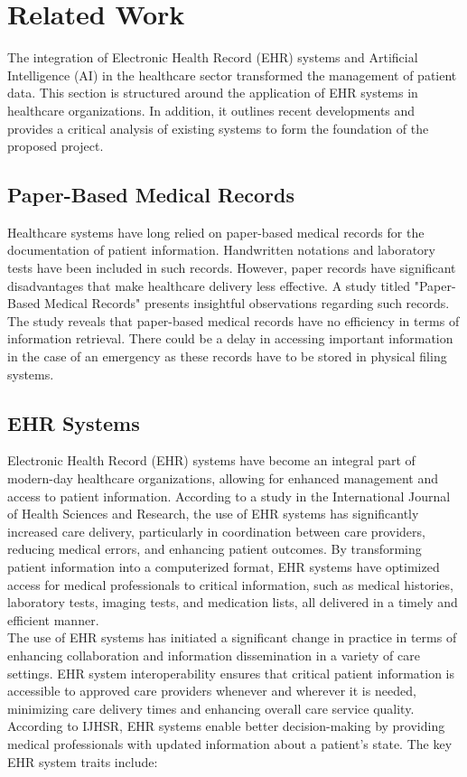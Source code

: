 \section{Related Work}
The integration of Electronic Health Record (EHR) systems and Artificial Intelligence (AI) in the healthcare sector transformed the management of patient data. This section is structured around the application of EHR systems in healthcare organizations. In addition, it outlines recent developments and provides a critical analysis of existing systems to form the foundation of the proposed project.
\subsection{Paper-Based Medical Records}
Healthcare systems have long relied on paper-based medical records for the documentation of patient information. Handwritten notations and laboratory tests have been included in such records. However, paper records have significant disadvantages that make healthcare delivery less effective. A study titled "Paper-Based Medical Records"  presents insightful observations regarding such records.\cite{article6}
The study reveals that paper-based medical records have no efficiency in terms of information retrieval. There could be a delay in accessing important information in the case of an emergency as these records have to be stored in physical filing systems.
\subsection{EHR Systems}
Electronic Health Record (EHR) systems have become an integral part of modern-day healthcare organizations, allowing for enhanced management and access to patient information. According to a study in the International Journal of Health Sciences and Research, the use of EHR systems has significantly increased care delivery, particularly in coordination between care providers, reducing medical errors, and enhancing patient outcomes. By transforming patient information into a computerized format, EHR systems have optimized access for medical professionals to critical information, such as medical histories, laboratory tests, imaging tests, and medication lists, all delivered in a timely and efficient manner.\cite{Odekunle2017}\\ 
The use of EHR systems has initiated a significant change in practice in terms of enhancing collaboration and information dissemination in a variety of care settings. EHR system interoperability ensures that critical patient information is accessible to approved care providers whenever and wherever it is needed, minimizing care delivery times and enhancing overall care service quality. According to IJHSR, EHR systems enable better decision-making by providing medical professionals with updated information about a patient's state.
The key EHR system traits include:

